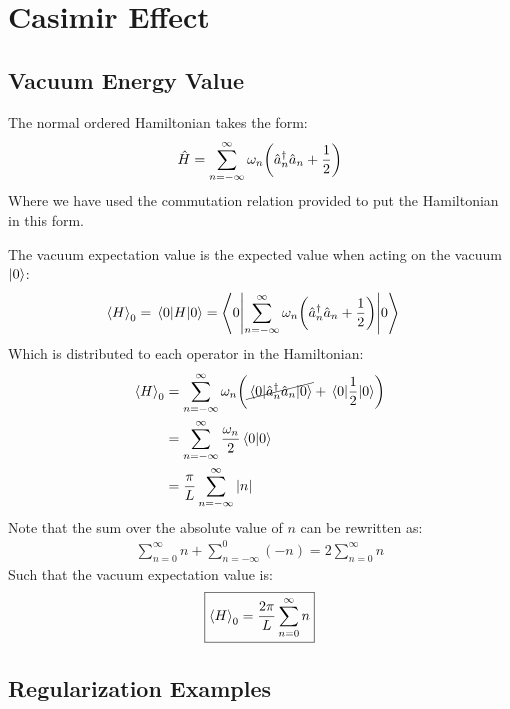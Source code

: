\documentclass[12pt]{article}
\begin{document}
\section{Casimir Effect}
\subsection{Vacuum Energy Value}
The normal ordered Hamiltonian takes the form:
\begin{align*}
  \hat{H}=\sum_{n=-\infty}^\infty\omega_n\qty(\hat{a}^\dag_n\hat{a}_n+\frac12)
\end{align*}
Where we have used the commutation relation provided to put the Hamiltonian in this form.

The vacuum expectation value is the expected value when acting on the vacuum $\ket{0}$:
\begin{align*}
  \ev{H}_0=\ev{H}{0}&=
  \ev**{\sum_{n=-\infty}^\infty\omega_n\qty(\hat{a}^\dag_n\hat{a}_n+\frac12)}{0}
\end{align*}
Which is distributed to each operator in the Hamiltonian:
\begin{align*}
  \ev{H}_0&=\sum_{n=-\infty}^\infty\omega_n
  \qty(\cancel{\ev{\hat{a}^\dag_n\hat{a}_n}{0}}+\ev{\frac12}{0})\\
  &=\sum_{n=-\infty}^\infty\frac{\omega_n}{2}\ip{0}\\
  &=\frac{\pi}{L}\sum_{n=-\infty}^\infty\abs{n}
\end{align*}
Note that the sum over the absolute value of $n$ can be rewritten as:
\begin{align*}
  \sum_{n=0}^\infty n+\sum_{n=-\infty}^0(-n)=2\sum_{n=0}^\infty n
\end{align*}
Such that the vacuum expectation value is:
\begin{align}
  \boxed{\ev{H}_0=\frac{2\pi}{L}\sum_{n=0}^\infty n}
\end{align}
\subsection{Regularization Examples}
\end{document}
